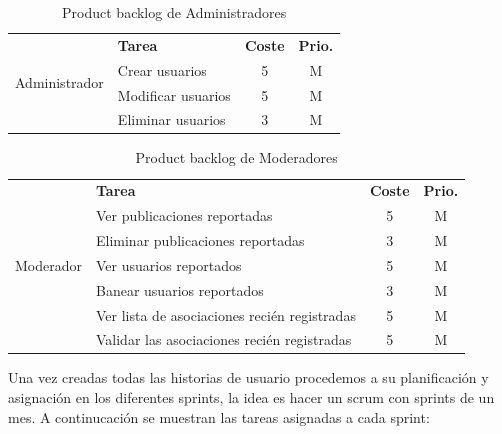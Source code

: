 \begin{table}[H]
    \centering
    \begin{tabular}{|c|p{8cm}|c|c|} \hline 
         \multirow[c]{4}{*}{Administrador}&  \textbf{Tarea}&  \textbf{Coste}& \textbf{Prio.}\\  \cline{2-4}
         &  Crear usuarios &  5& M\\ \cline{2-4}
         &  Modificar usuarios &  5& M\\ \cline{2-4}
         &  Eliminar usuarios &  3& M\\ \hline

         
         
    \end{tabular}
    \caption{Product backlog de Administradores}
    \label{tab:pb_administradores}
\end{table}

\begin{table}[H]
    \centering
    \begin{tabular}{|c|p{8cm}|c|c|} \hline 
         \multirow[c]{7}{*}{Moderador}&  \textbf{Tarea}&  \textbf{Coste}& \textbf{Prio.}\\  \cline{2-4}
         &  Ver publicaciones reportadas &  5& M\\ \cline{2-4}
         &  Eliminar publicaciones reportadas &  3& M\\ \cline{2-4}

         &  Ver usuarios reportados &  5& M\\ \cline{2-4}
         &  Banear usuarios reportados &  3& M\\ \cline{2-4}
         
         &  Ver lista de asociaciones recién registradas &  5& M\\ \cline{2-4}
         &  Validar las asociaciones recién registradas& 5 & M\\ \hline

         
         
    \end{tabular}
    \caption{Product backlog de Moderadores}
    \label{tab:pb_moderadores}
\end{table}

Una vez creadas todas las historias de usuario procedemos a su planificación y asignación en los diferentes sprints, la idea es hacer un scrum con sprints de un mes. A continucación se muestran las tareas asignadas a cada sprint: \\ \\


